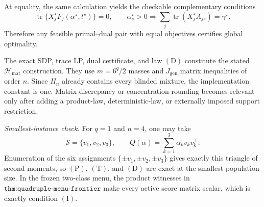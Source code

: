 At equality, the same calculation yields the checkable complementary conditions
\[
\operatorname{tr}\{X_j^\star F_j(\alpha^\star,t^\star)\}=0,
\qquad
\alpha_s^\star>0
\Longrightarrow
\sum_j\operatorname{tr}(X_j^\star A_{js})=\gamma^\star.
\tag{13}
\]
Therefore any feasible primal--dual pair with equal objectives certifies global optimality.

The exact SDP, trace LP, dual certificate, and law \((\mathrm D)\) constitute the stated \(\mathcal H_{\mathrm{mat}}\) construction. They use \(m=6^q/2\) masses and \(J_{\mathrm{gen}}\) matrix inequalities of order \(n\). Since \(\Pi_n\) already contains every blinded mixture, the implementation constant is one. Matrix-discrepancy or concentration rounding becomes relevant only after adding a product-law, deterministic-law, or externally imposed support restriction.

\textit{Smallest-instance check.}
For \(q=1\) and \(n=4\), one may take
\[
\mathscr S=\{v_1,v_2,v_3\},
\qquad
Q(\alpha)=\sum_{k=1}^3\alpha_kv_kv_k^\top.
\]
Enumeration of the six assignments \(\{\pm v_1,\pm v_2,\pm v_3\}\) gives exactly this triangle of second moments, so \((\mathrm P)\), \((\mathrm T)\), and \((\mathrm D)\) are exact at the smallest population size. In the frozen two-class menu, the product witnesses in \(\texttt{thm:quadruple-menu-frontier}\) make every active score matrix scalar, which is exactly condition \((\mathrm I)\).
